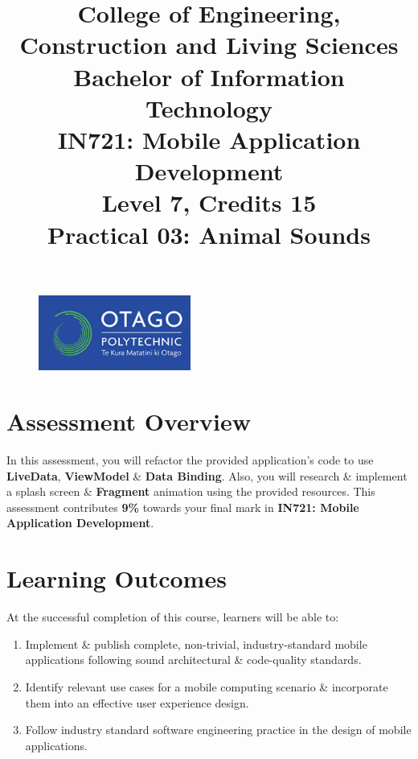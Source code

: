 \documentclass{article}
\author{}
\begin{document}
\begin{figure}
    \centering
    \includegraphics[width=50mm]{../../resources/img/logo.png}
\end{figure}

\title{College of Engineering, Construction and Living Sciences\\Bachelor of Information Technology\\IN721: Mobile Application Development\\Level 7, Credits 15\\\textbf{Practical 03: Animal Sounds}}
\date{}
\maketitle

\section*{Assessment Overview}
In this assessment, you will refactor the provided application's code to use \textbf{LiveData}, \textbf{ViewModel} \& \textbf{Data Binding}. Also, you will research \& implement a splash screen \& \textbf{Fragment} animation using the provided resources. This assessment contributes \textbf{9\%} towards your final mark in \textbf{IN721: Mobile Application Development}.

\section*{Learning Outcomes}
At the successful completion of this course, learners will be able to: 
\begin{enumerate}
	\item Implement \& publish complete, non-trivial, industry-standard mobile applications following sound architectural \& code-quality standards.
	\item Identify relevant use cases for a mobile computing scenario \& incorporate them into an effective user experience design.
	\item Follow industry standard software engineering practice in the design of mobile applications.
\end{enumerate} 
\end{document}
